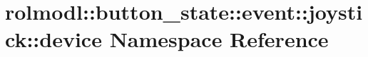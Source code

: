 \hypertarget{namespacerolmodl_1_1button__state_1_1event_1_1joystick_1_1device}{}\section{rolmodl\+::button\+\_\+state\+::event\+::joystick\+::device Namespace Reference}
\label{namespacerolmodl_1_1button__state_1_1event_1_1joystick_1_1device}
